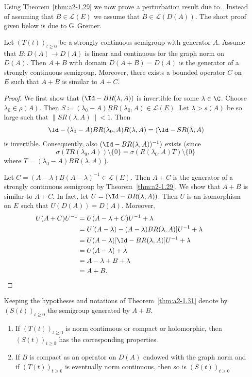 Using Theorem~\ref{thm:a2-1.29}   we now prove a perturbation result due to \textcite{deschschappacher:1984}.
Instead of assuming that $B \in \mathcal{L}(E)$ we assume that $B \in \mathcal{L}(D(A))$.
The short proof given below is due to G.\,Greiner.
\begin{theorem}\label{thm:a2-1.31}
Let $(T(t))_{t \geq 0}$ be a strongly continuous semigroup with generator $A$.
Assume that $B \colon D(A) \to D(A)$ is linear and continuous for the graph norm on $D(A)$.
Then $A + B$ with domain $D(A + B) = D(A)$ is the generator of a strongly continuous semigroup.
Moreover, there exists a bounded operator $C$ on $E$ such that $A + B$ is similar to $A + C$.
\end{theorem}
\begin{proof}
We first show that $(\Id - BR(\lambda,A))$ is invertible for some $\lambda \in \C$.
Choose $\lambda_{0} \in \rho(A)$.
Then $S \coloneqq (\lambda_{0}-A)BR(\lambda_{0},A) \in \mathcal{L}(E)$.
Let $\lambda > s(A)$ be so large such that $\|SR(\lambda,A)\| < 1$.
Then 
\[
\Id - (\lambda_{0} - A)BR(\lambda_{0},A)R(\lambda,A) = (\Id - SR(\lambda,A)
\]
is invertible.
Consequently, also $(\Id -BR(\lambda,A))^{-1})$ exists
(since 
\[
\sigma(TR(\lambda_{0},A)) \setminus \{0\} 
= \sigma(R(\lambda_{0},A)T) \setminus \{0\}\,
\]
where  $T = (\lambda_{0}-A)BR(\lambda,A)\, $).

Let $C = (A-\lambda)B(A-\lambda)^{-1} \in \mathcal{L}(E)$.
Then $A + C$ is the generator of a strongly continuous semigroup by Theorem~\ref{thm:a2-1.29}. 
We show that $A + B$ is similar to $A + C$.
In fact, let $U = (\Id - BR(\lambda,A))$.
Then $U$ is an isomorphism on $E$ such that $U(D(A)) = D(A)$. Moreover,
\begin{align*}		
U(A+C)U^{-1} &= U(A - \lambda+C)U^{-1} + \lambda \\
&= U[(A - \lambda) - (A-\lambda)BR(\lambda,A)]U^{-1} + \lambda \\
&= U(A - \lambda)[\Id - BR(\lambda,A)]U^{-1} + \lambda \\
&= U(A - \lambda) + \lambda \\
&= A - \lambda + B + \lambda \\
&= A + B.	&&\qedhere
\end{align*}
\end{proof}
\begin{corollary}\label{cor:a2-1.32}
Keeping the hypotheses and notations of Theorem~\ref{thm:a2-1.31} denote by 
$(S(t))_{t\geq 0}$ the semigroup generated by $A+B$.
\begin{enumerate}[\upshape(i)]
\item
If\/ $(T(t))_{t\geq 0}$ is norm continuous or compact or holomorphic, then $(S(t))_{t\geq 0}$ has the corresponding properties.

\item
If\/ $B$ is compact as an operator on $D(A)$ endowed with the graph norm and if\/ $(T(t))_{t\geq 0}$ is eventually norm continuous, then so is $(S(t))_{t\geq 0}$.
\end{enumerate}
\end{corollary}
